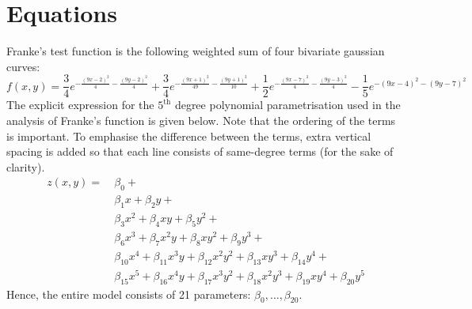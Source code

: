 \documentclass[reprint,english]{revtex4-1}
\begin{document}
\section{Equations}\label{app:list_of_eq}
Franke's test function is the following weighted sum of four bivariate gaussian curves:
\begin{equation}\label{eq:appendix:Franke:Franke_function}
f(x,y)=\frac{3}{4}e^{-\frac{(9x-2)^2}{4}-\frac{(9y-2)^2}{4}}+\frac{3}{4}e^{-\frac{(9x+1)^2}{49}-\frac{(9y+1)^2}{10}}
+\frac{1}{2}e^{-\frac{(9x-7)^2}{4}-\frac{(9y-3)^2}{4}}-\frac{1}{5}e^{-(9x-4)^2-(9y-7)^2}
\end{equation}
The explicit expression for the \(5^{\text{th}}\) degree polynomial parametrisation used in the analysis of Franke's function is given below. Note that the ordering of the terms is important. To emphasise the difference between the terms, extra vertical spacing is added so that each line consists of same-degree terms (for the sake of clarity).
\begin{align}\label{eq:appendix:Franke:general_5th_order_model}
z(x,y)=\ &\beta_0+\nonumber\\
         &\beta_1x      +\beta_2y+\nonumber\\
         &\beta_3x^2    +\beta_4xy      +\beta_5y^2+\nonumber\\
         &\beta_6x^3    +\beta_7x^2y    +\beta_8xy^2      +\beta_9y^3+\nonumber\\
         &\beta_{10}x^4 +\beta_{11}x^3y +\beta_{12}x^2y^2 +\beta_{13}xy^3   +\beta_{14}y^4+\nonumber\\
         &\beta_{15}x^5 +\beta_{16}x^4y +\beta_{17}x^3y^2 +\beta_{18}x^2y^3 +\beta_{19}xy^4+\beta_{20}y^5
\end{align}
Hence, the entire model consists of 21 parameters: \(\beta_0,\ldots,\beta_{20}\).
\twocolumngrid
\end{document}
